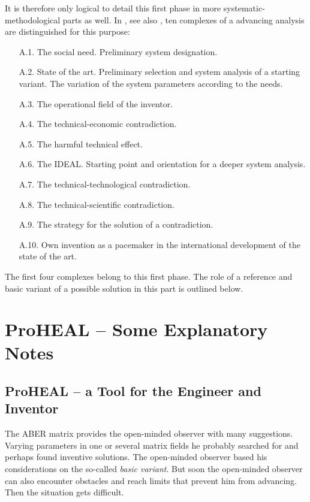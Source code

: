 \documentclass[11pt,a4paper]{article}
\begin{document}
It is therefore only logical to detail this first phase in more
systematic-methodological parts as well. In \cite[Part A]{RT89}, see also
\cite[Part 3]{RM-21}, ten complexes of a advancing analysis are distinguished
for this purpose:
\begin{itemize}[leftmargin=40pt,align=left]
\item[A.1.] The social need. Preliminary system designation.
\item[A.2.] State of the art. Preliminary selection and system analysis of a
  starting variant. The variation of the system parameters according to the
  needs.
\item[A.3.] The operational field of the inventor.
\item[A.4.] The technical-economic contradiction.
\item[A.5.] The harmful technical effect.
\item[A.6.] The IDEAL. Starting point and orientation for a deeper system
  analysis.
\item[A.7.] The technical-technological contradiction.
\item[A.8.] The technical-scientific contradiction.
\item[A.9.] The strategy for the solution of a contradiction.
\item[A.10.] Own invention as a pacemaker in the international
  development of the state of the art.
\end{itemize}
The first four complexes belong to this first phase.  The role of a reference
and basic variant of a possible solution in this part is outlined below.

\section{ProHEAL -- Some Explanatory Notes}

\subsection{ProHEAL -- a Tool for the Engineer and Inventor}

The ABER matrix provides the open-minded observer with many suggestions.
Varying parameters in one or several matrix fields he probably searched for
and perhaps found inventive solutions. The open-minded observer based his
considerations on the so-called \emph{basic variant}. But soon the open-minded
observer can also encounter obstacles and reach limits that prevent him from
advancing. Then the situation gets difficult.
\end{document}
